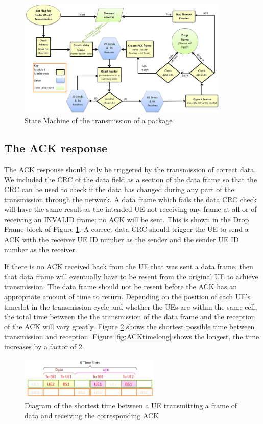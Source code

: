 \begin{figure}[ht]
    \centering
    \includegraphics[width=0.9\textwidth]{State_Machine_yellow.PNG}
    \caption{State Machine of the transmission of a package }
    \label{fig:stateMachine}
\end{figure}

\subsection {The ACK response }
The ACK response should only be triggered by the transmission of correct data. We included the CRC of the data field as a section of the data frame so that the CRC can be used to check if the data has changed during any part of the transmission through the network. A data frame which fails the data CRC check will have the same result as the intended UE not receiving any frame at all or of receiving an INVALID frame: no ACK will be sent. This is shown in the Drop Frame block of Figure \ref{fig:stateMachine}. A correct data CRC should trigger the UE to send a ACK with the receiver UE ID number as the sender and the sender UE ID number as the receiver. 

If there is no ACK received back from the UE that was sent a data frame, then that data frame will eventually have to be resent from the original UE to achieve transmission. The data frame should not be resent before the ACK has an appropriate amount of time to return. Depending on the position of each UE's timeslot in the transmission cycle and whether the UEs are within the same cell, the total time between the the transmission of the data frame and the reception of the ACK will vary greatly. Figure \ref{fig:ACKtimeshort} shows the shortest possible time between transmission and reception. Figure \ref{fig:ACKtimelong} shows the longest, the time increases by a factor of 2. 

\begin{figure}[ht]
    \centering
    \includegraphics[width=0.6\textwidth]{ACK_timeout_short.PNG}
    \caption{Diagram of the shortest time between a UE transmitting a frame of data and receiving the corresponding ACK}
    \label{fig:ACKtimeshort}
\end{figure}

